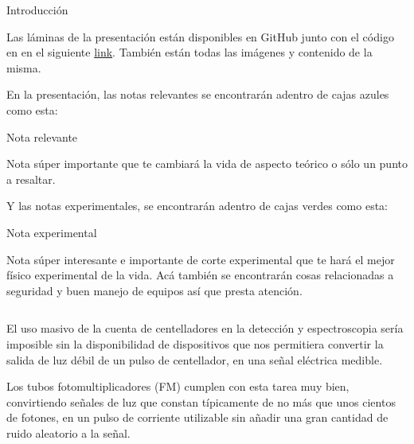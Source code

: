 \documentclass[a4paper,10pt]{beamer}
\begin{document}
\begin{frame}[allowframebreaks]{Introducción}

\begin{justify}
 
 Las láminas de la presentación están disponibles en GitHub junto con el código en 
 en el siguiente \href{https://github.com/FavioVazquez/DeteccionRayosCosmicos-PCF}{\color{blue} link}.
 También están todas las imágenes y contenido de la misma.
 
 \vspace{.3cm}
 
 En la presentación, las notas relevantes se encontrarán adentro de cajas azules como esta:
 
 \begin{block}{Nota relevante}
 \begin{justify}
  Nota súper importante que te cambiará la vida de aspecto teórico o sólo un 
  punto a resaltar.
  \end{justify}
 \end{block}
 
 Y las notas experimentales, se encontrarán adentro de cajas verdes como esta:
 
 \begin{exampleblock}{Nota experimental}
 \begin{justify}
  Nota súper interesante e importante de corte experimental que te hará el mejor 
  físico experimental de la vida. Acá también se encontrarán cosas relacionadas 
  a seguridad y buen manejo de equipos así que presta atención.
  \end{justify}
 \end{exampleblock}
 
\end{justify}

\framebreak

\begin{justify}

\begin{columns}[c]
 
 \column{2.2in}
 \begin{justify}
 El uso masivo de la cuenta de centelladores en la detección y espectroscopia sería 
 imposible sin la disponibilidad de dispositivos que nos permitiera convertir la 
 salida de luz débil de un pulso de centellador, en una señal eléctrica medible. 
 
 \vspace{.3cm}
 
 Los tubos fotomultiplicadores (FM) cumplen con esta tarea muy bien, convirtiendo señales 
 de luz que constan típicamente de no más que unos cientos de fotones, en un pulso 
 de corriente utilizable sin añadir una gran cantidad de ruido aleatorio a la señal.
 \end{justify}
 \column{2in}
 

\end{columns}
\end{justify}
\end{frame}
\end{document}

